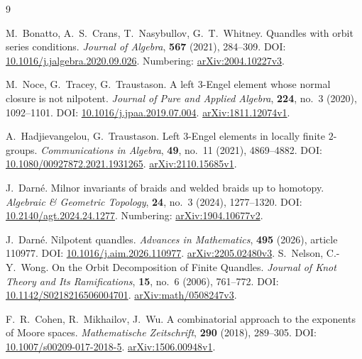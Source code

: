 \documentclass[11pt,a4paper]{article}
\theoremstyle{definition}
\theoremstyle{remark}
\begin{document}
\begin{thebibliography}{9}
\small
\raggedright
{}
M.~Bonatto, A.~S.~Crans, T.~Nasybullov, G.~T.~Whitney.
\newblock Quandles with orbit series conditions.
\newblock \emph{Journal of Algebra}, \textbf{567} (2021), 284--309.
\newblock DOI:
\href{https://doi.org/10.1016/j.jalgebra.2020.09.026}{10.1016/j.jalgebra.2020.09.026}.
\newblock Numbering:
\href{https://arxiv.org/abs/2004.10227v3}{arXiv:2004.10227v3}.

M.~Noce, G.~Tracey, G.~Traustason.
\newblock A left \(3\)-Engel element whose normal closure is not nilpotent.
\newblock \emph{Journal of Pure and Applied Algebra},
\textbf{224}, no.~3 (2020), 1092--1101.
\newblock DOI:
\href{https://doi.org/10.1016/j.jpaa.2019.07.004}{10.1016/j.jpaa.2019.07.004}.
\newblock \href{https://arxiv.org/abs/1811.12074v1}{arXiv:1811.12074v1}.

A.~Hadjievangelou, G.~Traustason.
\newblock Left \(3\)-Engel elements in locally finite \(2\)-groups.
\newblock \emph{Communications in Algebra}, \textbf{49}, no.~11 (2021),
4869--4882.
\newblock DOI:
\href{https://doi.org/10.1080/00927872.2021.1931265}{10.1080/00927872.2021.1931265}.
\newblock \href{https://arxiv.org/abs/2110.15685v1}{arXiv:2110.15685v1}.

J.~Darn\'e.
\newblock Milnor invariants of braids and welded braids up to homotopy.
\newblock \emph{Algebraic \& Geometric Topology},
\textbf{24}, no.~3 (2024), 1277--1320.
\newblock DOI:
\href{https://doi.org/10.2140/agt.2024.24.1277}{10.2140/agt.2024.24.1277}.
\newblock Numbering:
\href{https://arxiv.org/abs/1904.10677v2}{arXiv:1904.10677v2}.

J.~Darn\'e.
\newblock Nilpotent quandles.
\newblock \emph{Advances in Mathematics}, \textbf{495} (2026), article 110977.
\newblock DOI:
\href{https://doi.org/10.1016/j.aim.2026.110977}{10.1016/j.aim.2026.110977}.
\newblock \href{https://arxiv.org/abs/2205.02480v3}{arXiv:2205.02480v3}.
S.~Nelson, C.-Y.~Wong.
\newblock On the Orbit Decomposition of Finite Quandles.
\newblock \emph{Journal of Knot Theory and Its Ramifications},
\textbf{15}, no.~6 (2006), 761--772.
\newblock DOI:
\href{https://doi.org/10.1142/S0218216506004701}{10.1142/S0218216506004701}.
\newblock \href{https://arxiv.org/abs/math/0508247v3}{arXiv:math/0508247v3}.

F.~R.~Cohen, R.~Mikhailov, J.~Wu.
\newblock A combinatorial approach to the exponents of Moore spaces.
\newblock \emph{Mathematische Zeitschrift}, \textbf{290} (2018), 289--305.
\newblock DOI:
\href{https://doi.org/10.1007/s00209-017-2018-5}{10.1007/s00209-017-2018-5}.
\newblock \href{https://arxiv.org/abs/1506.00948v1}{arXiv:1506.00948v1}.


\end{thebibliography}
\end{document}
